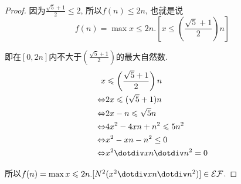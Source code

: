 \begin{proof}
    因为$\frac{\sqrt{5}+1}{2}\leqslant 2$, 所以$f(n)\leqslant 2n$, 也就是说
    $$f(n)=\max x\leqslant 2n. \left[x\leqslant \left(\frac{\sqrt{5}+1}{2}\right)n\right]$$
	
    即在$[0,2n]$内不大于$\left(\frac{\sqrt{5}+1}{2}\right)$的最大自然数.
    $$\begin{aligned}
        x&\leqslant \left(\frac{\sqrt{5}+1}{2}\right)n\\
        \Leftrightarrow &2x\leqslant (\sqrt{5}+1)n\\
        \Leftrightarrow &2x-n\leqslant \sqrt{5}n\\
        \Leftrightarrow &4x^2-4xn+n^2\leqslant 5n^2\\
        \Leftrightarrow &x^2-xn-n^2\leq 0\\
        \Leftrightarrow &x^2\dotdiv xn\dotdiv n^2 = 0
    \end{aligned}$$
	
    所以$f(n)=\max x\leqslant 2n.[N^2(x^2\dotdiv xn\dotdiv n^2)]\in\EF$.
\end{proof}
\iffalse
\subsubsection{$f(n)=\left\lfloor\left(\frac{\sqrt{5}+1}{2}\right)^n\right\rfloor\in\EF.$}
    依照宋公的说法, 题目本来是$f(n)=\left\lfloor\left(\frac{\sqrt{5}+1}{2}\right)^n\right\rfloor$的, 以下给出证明:
\begin{proof}
    因为$\frac{\sqrt{5}+1}{2}\leqslant 2$, 所以$f(n)\leqslant 2^n$, 也就是说
    $$f(n)=\max x\leqslant 2^n. \left[x\leqslant \left(\frac{\sqrt{5}+1}{2}\right)^n\right]$$
    $$\begin{aligned}
        x&\leqslant \left(\frac{\sqrt{5}+1}{2}\right)^n\\
        \Leftrightarrow &2^nx\leqslant (\sqrt{5}+1)^n\\
        \Leftrightarrow &2^{2n}x^2\leqslant (\sqrt{5}+1)^{2n}\\
        \Leftrightarrow &2^{2n}x^2\leqslant \sum_{i=0}^{2n}{2n \choose i}(\sqrt{5})^{2n-1}
    \end{aligned}$$
    而
    $$\sum_{i=0}^{2n}{2n \choose i}(\sqrt{5})^{2n-1}=\sum_{i=0}^{n} {2n \choose 2i} 5^{n-i}+\sum_{i=0}^{n-1}{2n \choose 2i+1}5^{n-i-1}\cdot \sqrt{5}$$
    令$g_1(n)=\sum_{i=0}^{n} {2n \choose 2i} 5^{n-i}$, $g_2(n)=\sum_{i=0}^{n-1}{2n \choose 2i+1}5^{n-i-1}$, 易证$g_1,g_2\in\EF$.

    故需要证明$2^{2n}x^2\leqslant g_1(n)+g_2(n)\cdot\sqrt{5}$是初等数论谓词.
    $$\begin{aligned}
        2^{2n}x^2&\leqslant g_1(n)+g_2(n)\cdot\sqrt{5}\\
        \Rightarrow (2^{2n}x^2-g_1(n))^2\leqslant (g_1(n))^2\cdot 5
    \end{aligned}$$
\end{proof}
\fi